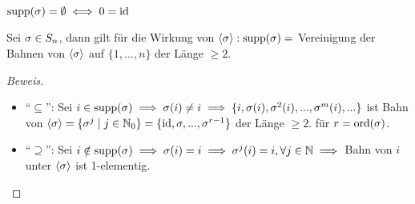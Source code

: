 \documentclass[a4paper]{report}
\begin{document}
\begin{bem*}
$\operatorname{supp}(\sigma) = \emptyset \iff 0 = \operatorname{id}$
\end{bem*}

\begin{lemm}
  Sei $\sigma \in S_n$, dann gilt für die Wirkung von $\langle \sigma \rangle : \operatorname{supp}(\sigma) =$ Vereinigung der Bahnen von $\langle \sigma \rangle$ auf $\{1, ..., n\}$ der Länge $\ge 2$.
\end{lemm}
\begin{proof}[Beweis] \item
\begin{itemize}
\item ``$\subseteq$'': Sei $i \in \operatorname{supp}(\sigma) \implies \sigma(i) \ne i \implies \{i, \sigma(i), \sigma^{2}(i), ..., \sigma^{m}(i), ...\}$ ist Bahn von $\langle\sigma\rangle = \{\sigma^{j} \mid j \in \mathbb{N}_0\} = \{\operatorname{id}, \sigma, ..., \sigma^{r-1}\}$ der Länge $\ge 2$. für $r = \operatorname{ord}(\sigma)$.
\item ``$\supseteq$'': Sei $i \notin \operatorname{supp}(\sigma) \implies \sigma(i) = i \implies \sigma^{j}(i) = i, \forall j \in \mathbb{N} \implies$ Bahn von $i$ unter $\langle\sigma\rangle$ ist 1-elementig.
\end{itemize}
\end{proof}
\end{document}
